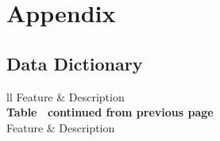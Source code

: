 \chapter{Appendix}\label{chap:appendix}



\section{Data Dictionary}


\begin{longtable}[c]{ll}
    \hline
    Feature                                    & Description                                                                                                               \\ 
    \hline
    \endfirsthead
    {{\bfseries Table \thetable\ continued from previous page}} \\
    \hline
    Feature                                    & Description                                                                                                               \\ 
    \hline
    \endhead
    \hline
    \endfoot
    \endlastfoot


\end{longtable}
